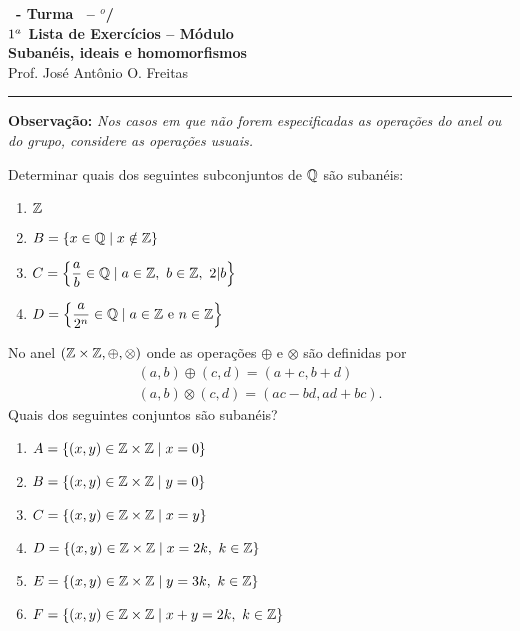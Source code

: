 \documentclass[12pt]{exam}
\begin{document}
    \begin{center}
    {\Large\bf \disciplina\ - Turma \turma\ -- \semestre$^{o}$/\ano} \\ \vspace{9pt} {\large\bf
        $1^a$ Lista de Exercícios -- Módulo \numeromodulo\\ Subanéis, ideais e homomorfismos}\\ \vspace{9pt} Prof. José Antônio O. Freitas
    \end{center}
    \hrule

    \vspace{.6cm}

    \textbf{Observação: }\textit{Nos casos em que não forem especificadas as operações do anel ou do grupo, considere as operações usuais.}

\vspace{.6cm}

\questao{} Determinar quais dos seguintes subconjuntos de $\mathbb{Q}$ são subanéis:
\begin{multicols}{2}
    \begin{enumerate}[label=({\alph*})]
        \item $\mathbb{Z}$
        \item $B = \{x \in \mathbb{Q} \mid x \notin \mathbb{Z}\}$
        \item $C = \left\{\dfrac{a}{b} \in \mathbb{Q} \mid a \in \mathbb{Z},\ b \in \mathbb{Z},\ 2 |b \right\}$
        \item $D = \left\{\dfrac{a}{2^n} \in \mathbb{Q} \mid a \in \mathbb{Z} \mbox{ e } n \in \mathbb{Z} \right\}$
    \end{enumerate}
\end{multicols}

\vspace{.3cm}

\questao{} No anel $(\mathbb{Z} \times \mathbb{Z}, \oplus, \otimes)$ onde as operações $\oplus$ e $\otimes$ são definidas por
\begin{align*}
    (a, b) \oplus (c, d) = (a + c, b + d)\\
    (a ,b) \otimes (c, d) = (ac - bd, ad + bc).
\end{align*}
Quais dos seguintes conjuntos são subanéis?
\begin{enumerate}[label=({\alph*})]
    \item $A = \{(x, y) \in \mathbb{Z} \times \mathbb{Z} \mid x = 0\}$
    \item $B = \{(x, y) \in \mathbb{Z} \times \mathbb{Z} \mid y = 0\}$
    \item $C = \{(x, y) \in \mathbb{Z} \times \mathbb{Z} \mid x = y\}$
    \item $D = \{(x, y) \in \mathbb{Z} \times \mathbb{Z} \mid x = 2k,\ k \in \mathbb{Z}\}$
    \item $E = \{(x, y) \in \mathbb{Z} \times \mathbb{Z} \mid y = 3k,\ k \in \mathbb{Z}\}$
    \item $F = \{(x, y) \in \mathbb{Z} \times \mathbb{Z} \mid x + y = 2k,\ k \in \mathbb{Z}\}$
\end{enumerate}
\end{document}
